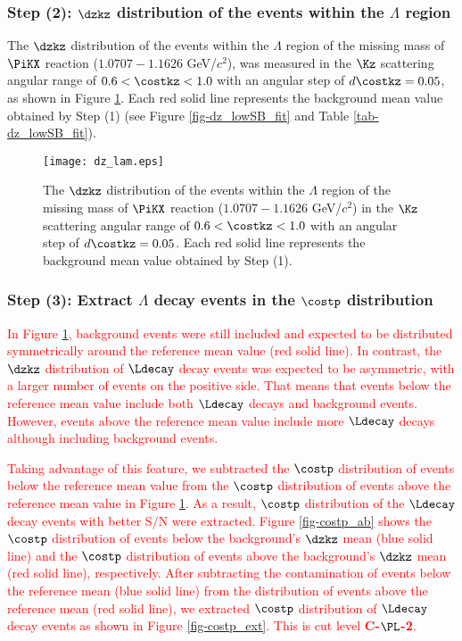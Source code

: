 \subsubsection{Step (2): $\dzkz$ distribution of the events within the $\Lambda$ region}
The $\dzkz$ distribution of the events within the $\Lambda$ region of the missing mass of $\PiKX$ reaction ($1.0707-1.1626$ GeV/$c^{2}$), was measured in the $\Kz$ scattering angular range of $0.6<\costkz<1.0$ with an angular step of $d\costkz=0.05$, as shown in Figure \ref{fig-dz_lam}. Each red solid line represents the background mean value obtained by Step (1) (see Figure \ref{fig-dz_lowSB_fit} and Table \ref{tab-dz_lowSB_fit}). 

\begin{figure}[h]
  \centering
  \texttt{[image: dz\_lam.eps]}
  \caption{The $\dzkz$ distribution of the events within the $\Lambda$ region of the missing mass of $\PiKX$ reaction ($1.0707-1.1626$ GeV/$c^{2}$) in the $\Kz$ scattering angular range of $0.6<\costkz<1.0$ with an angular step of $d\costkz=0.05$. Each red solid line represents the background mean value obtained by Step (1).}
  \label{fig-dz_lam}
\end{figure}


\subsubsection{Step (3): Extract $\Lambda$ decay events in the $\costp$ distribution}
\textcolor{red}{ In Figure \ref{fig-dz_lam}, background events were still included and expected to be distributed symmetrically around the reference mean value (red solid line). In contrast, the $\dzkz$ distribution of $\Ldecay$ decay events was expected to be asymmetric, with a larger number of events on the positive side. That means that events below the reference mean value include both $\Ldecay$ decays and background events. However, events above the reference mean value include more $\Ldecay$ decays although including background events. }

\textcolor{red}{ Taking advantage of this feature, we subtracted the $\costp$ distribution of events below the reference mean value from the $\costp$ distribution of events above the reference mean value in Figure \ref{fig-dz_lam}. As a result, $\costp$ distribution of the $\Ldecay$ decay events with better S/N were extracted. Figure \ref{fig-costp_ab} shows the $\costp$ distribution of events below the background's $\dzkz$ mean (blue solid line) and the $\costp$ distribution of events above the background's $\dzkz$ mean (red solid line), respectively. After subtracting the contamination of events below the reference mean (blue solid line) from the distribution of events above the reference mean (red solid line), we extracted $\costp$ distribution of $\Ldecay$ decay events as shown in Figure \ref{fig-costp_ext}. This is cut level {\bf C-$\PL$-2}. }

